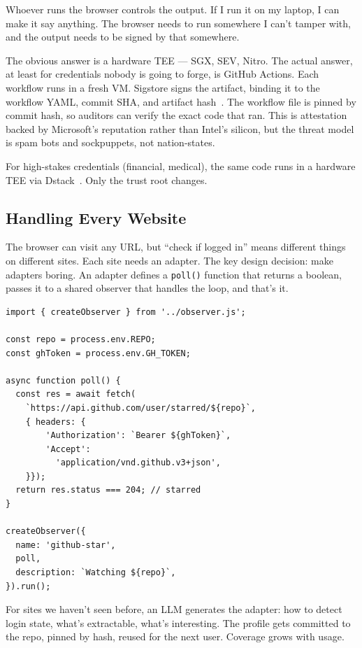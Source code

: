 \documentclass[twocolumn,10pt]{article}
\begin{document}
Whoever runs the browser controls the output.
If I run it on my laptop, I can make it say anything.
The browser needs to run somewhere I can't tamper with, and the output needs to be signed by that somewhere.

The obvious answer is a hardware TEE --- SGX, SEV, Nitro.
The actual answer, at least for credentials nobody is going to forge, is GitHub Actions.
Each workflow runs in a fresh VM.
Sigstore signs the artifact, binding it to the workflow YAML, commit SHA, and artifact hash~\cite{sigstore, in-toto}.
The workflow file is pinned by commit hash, so auditors can verify the exact code that ran.
This is attestation backed by Microsoft's reputation rather than Intel's silicon, but the threat model is spam bots and sockpuppets, not nation-states.

For high-stakes credentials (financial, medical), the same code runs in a hardware TEE via Dstack~\cite{dstack}.
Only the trust root changes.

\subsection{Handling Every Website}

The browser can visit any URL, but ``check if logged in'' means different things on different sites.
Each site needs an adapter.
The key design decision: make adapters boring.
An adapter defines a \texttt{poll()} function that returns a boolean, passes it to a shared observer that handles the loop, and that's it.

\begin{lstlisting}[caption={GitHub star adapter (actual code).},label=lst:adapter]
import { createObserver } from '../observer.js';

const repo = process.env.REPO;
const ghToken = process.env.GH_TOKEN;

async function poll() {
  const res = await fetch(
    `https://api.github.com/user/starred/${repo}`,
    { headers: {
        'Authorization': `Bearer ${ghToken}`,
        'Accept':
          'application/vnd.github.v3+json',
    }});
  return res.status === 204; // starred
}

createObserver({
  name: 'github-star',
  poll,
  description: `Watching ${repo}`,
}).run();
\end{lstlisting}

For sites we haven't seen before, an LLM generates the adapter: how to detect login state, what's extractable, what's interesting.
The profile gets committed to the repo, pinned by hash, reused for the next user.
Coverage grows with usage.
\end{document}
